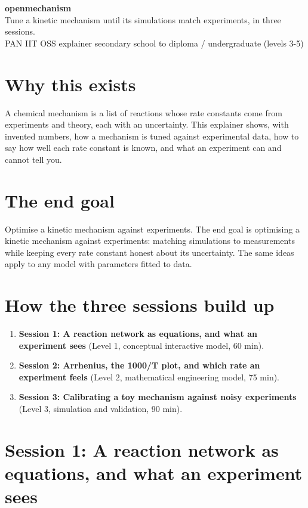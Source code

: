 \documentclass[11pt,a4paper]{article}
\begin{document}
\begin{center}{\LARGE\bfseries openmechanism}\\[0.4em]{\large Tune a kinetic mechanism until its simulations match experiments, in three sessions.}\\[0.2em]\small PAN IIT OSS explainer \textbullet{} secondary school to diploma / undergraduate (levels 3-5)\end{center}

\section*{Why this exists}
A chemical mechanism is a list of reactions whose rate constants come from experiments and theory, each with an uncertainty. This explainer shows, with invented numbers, how a mechanism is tuned against experimental data, how to say how well each rate constant is known, and what an experiment can and cannot tell you.

\section*{The end goal}
Optimise a kinetic mechanism against experiments. The end goal is optimising a kinetic mechanism against experiments: matching simulations to measurements while keeping every rate constant honest about its uncertainty. The same ideas apply to any model with parameters fitted to data.

\section*{How the three sessions build up}
\begin{enumerate}[nosep]
\item \textbf{Session 1: A reaction network as equations, and what an experiment sees} (Level 1, conceptual interactive model, 60 min).
\item \textbf{Session 2: Arrhenius, the 1000/T plot, and which rate an experiment feels} (Level 2, mathematical engineering model, 75 min).
\item \textbf{Session 3: Calibrating a toy mechanism against noisy experiments} (Level 3, simulation and validation, 90 min).
\end{enumerate}

\section{Session 1: A reaction network as equations, and what an experiment sees}
\end{document}
